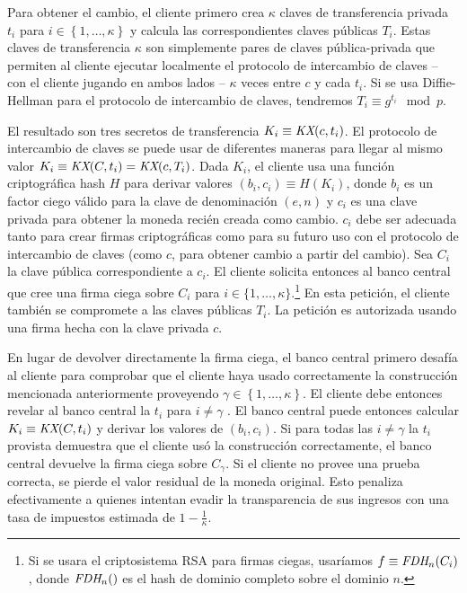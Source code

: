 \documentclass[a4paper,10pt]{article} %
\begin{document}
Para obtener el cambio, el cliente primero crea $\kappa$ claves de
transferencia privada $t_{i}$ para
$i \in \left\{ 1,\ldots,\kappa \right\}$ y calcula las
correspondientes claves públicas $T_{i}$. Estas claves de
transferencia $\kappa$ son simplemente pares de claves pública-privada
que permiten al cliente ejecutar localmente el protocolo de intercambio
de claves -- con el cliente jugando en ambos lados -- $\kappa$ veces
entre $c$ y cada $t_{i}$. Si se usa Diffie-Hellman para el protocolo de
intercambio de claves, tendremos
$T_{i} \equiv g^{t_{i}} \mod p$.

El resultado son tres secretos de transferencia
$K_{i} \equiv \emph{KX}(c,t_{i})$. El protocolo de
intercambio de claves se puede usar de diferentes maneras para llegar al
mismo valor
$K_{i} \equiv \emph{KX}(C,t_{i}) = \emph{KX}(c,T_{i})$.
Dada $K_{i}$, el cliente usa una función criptográfica hash $H$ para
derivar valores
$(b_{i},c_{i}) \equiv H(K_{i})$, donde
$b_{i}$ es un factor ciego válido para la clave de denominación
$(e,n)$ y $c_{i}$ es una clave privada para obtener la
moneda recién creada como cambio. $c_{i}$ debe ser adecuada tanto para
crear firmas criptográficas como para su futuro uso con el protocolo de
intercambio de claves (como $c$, para obtener cambio a partir del cambio).
Sea $C_{i}$ la clave pública correspondiente a $c_{i}$. El cliente
solicita entonces al banco central que cree una firma ciega sobre
$C_{i}$ para $i \in \{ 1,\ldots,\kappa\}$.\footnote{Si se usara el
criptosistema RSA para firmas ciegas, usaríamos
$f \equiv \emph{FDH}_{n}(C_{i})$, donde
$\emph{FDH}_{n}()$ es el hash de dominio completo sobre
el dominio $n$.} En esta petición, el cliente también se compromete a
las claves públicas $T_{i}$. La petición es autorizada usando una
firma hecha con la clave privada $c$.

En lugar de devolver directamente la firma ciega, el banco central
primero desafía al cliente para comprobar que el cliente haya usado
correctamente la construcción mencionada anteriormente proveyendo
$\gamma \in \left\{ 1,\ldots,\kappa \right\}$. El cliente debe
entonces revelar al banco central la $t_{i}$ para $i \neq \gamma$ .
El banco central puede entonces calcular
$K_{i} \equiv \emph{KX}(C,t_{i})$ y derivar los valores
de $(b_{i},c_{i})$. Si para todas las $i \neq \gamma$
la $t_{i}$ provista demuestra que el cliente usó la construcción
correctamente, el banco central devuelve la firma ciega sobre
$C_{\gamma}$. Si el cliente no provee una prueba correcta, se pierde
el valor residual de la moneda original. Esto penaliza efectivamente a
quienes intentan evadir la transparencia de sus ingresos con una tasa de
impuestos estimada de $1 - \frac{1}{\kappa}$.
\end{document}
